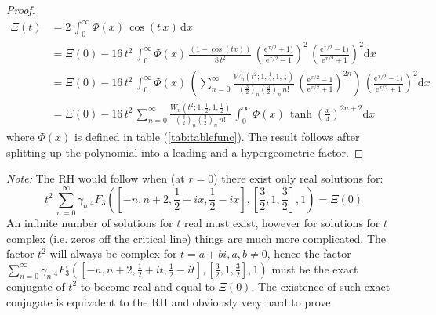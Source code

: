 \documentclass[a4paper,11pt,twoside]{amsart}
\newcommand{\verifiedeq}{=}
\newcommand{\verifiedeq}{\stackrel{\checkmark}{=}}
\begin{document}
\begin{proof}
\begin{align}
 \Xi(t) &\verifiedeq 2\,\int_{0}^\infty \Phi(x)\,\cos(t\,x)\, \mathrm{d}x \\
  &\verifiedeq\Xi(0)- 16\,t^2\, \int_{0}^\infty \Phi(x)\, \frac{(1-\cos(tx))}{8\,t^2}\,\left(\frac{\textrm{e}^{x/2}+1)}{\textrm{e}^{x/2}-1}\right)^2\,\left(\frac{\textrm{e}^{x/2}-1)}{\textrm{e}^{x/2}+1}\right)^2 \mathrm{d}x\\
  &\verifiedeq\Xi(0)- 16\,t^2\, \int_{0}^\infty \Phi(x)\,\left(\sum_{n=0}^\infty\frac{W_n\left(t^2;1,\frac12,1,\frac12\right)}{\left(\frac32\right)_n\left(\frac32\right)_n\,n!}\, \left(\frac{\textrm{e}^{x/2}-1}{\textrm{e}^{x/2}+1}\right)^{2n}\right)\,\left(\frac{\textrm{e}^{x/2}-1)}{\textrm{e}^{x/2}+1}\right)^2 \mathrm{d}x \\
  &\verifiedeq\Xi(0)- 16\,t^2\, \sum_{n=0}^\infty \frac{W_n\left(t^2;1,\frac12,1,\frac12\right)}{\left(\frac32\right)_n\left(\frac32\right)_n\,n!}\,\int_{0}^\infty \Phi(x)\,\tanh\left(\frac{x}{4}\right)^{2n+2} \mathrm{d}x
\end{align}
where $\Phi(x)$ is defined in table (\ref{tab:tablefunc}). The result follows after splitting up the polynomial into a leading and a hypergeometric factor.
\end{proof} 
\textit{Note:} The RH would follow when (at $r=0$) there exist only real solutions for:
\begin{equation}
  t^2\,\sum_{n=0}^{\infty} \gamma_n\, {}_4F_3\left(\left[-n, n+2,\frac12+ix, \frac12- ix\right],\left[\frac32, 1, \frac32\right], 1\right) \verifiedeq \Xi(0)
\end{equation}
An infinite number of solutions for $t$ real must exist, however for solutions for $t$ complex (i.e. zeros off the critical line) things are much more complicated. The factor $t^2$ will always be complex for $t=a+bi, a,b \ne 0$, hence the factor $\sum_{n=0}^{\infty} \gamma_n\, {}_4F_3\left(\left[-n, n+2,\frac12+it, \frac12- it\right],\left[\frac32, 1, \frac32\right], 1\right)$ must be the exact conjugate of $t^2$ to become real and equal to $\Xi(0)$. The existence of such exact conjugate is equivalent to the RH and obviously very hard to prove. 
\end{document}

